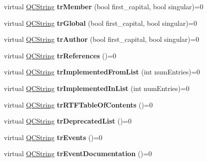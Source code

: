 \begin{DoxyCompactItemize}
virtual \mbox{\hyperlink{class_q_c_string}{Q\+C\+String}} {\bfseries tr\+Member} (bool first\+\_\+capital, bool singular)=0
\item 
\mbox{\label{class_translator_a5a2679653633e7b81db3158b90216704}} 
virtual \mbox{\hyperlink{class_q_c_string}{Q\+C\+String}} {\bfseries tr\+Global} (bool first\+\_\+capital, bool singular)=0
\item 
\mbox{\label{class_translator_ab1d687861b87ec383f96cc0b323be6eb}} 
virtual \mbox{\hyperlink{class_q_c_string}{Q\+C\+String}} {\bfseries tr\+Author} (bool first\+\_\+capital, bool singular)=0
\item 
\mbox{\label{class_translator_a9c8edf9885d809f859f7c91d847d2f67}} 
virtual \mbox{\hyperlink{class_q_c_string}{Q\+C\+String}} {\bfseries tr\+References} ()=0
\item 
\mbox{\label{class_translator_af6f635d2008014eab980bc9aa8544606}} 
virtual \mbox{\hyperlink{class_q_c_string}{Q\+C\+String}} {\bfseries tr\+Implemented\+From\+List} (int num\+Entries)=0
\item 
\mbox{\label{class_translator_a7d211e806e62d4203fa532b4735be716}} 
virtual \mbox{\hyperlink{class_q_c_string}{Q\+C\+String}} {\bfseries tr\+Implemented\+In\+List} (int num\+Entries)=0
\item 
\mbox{\label{class_translator_a68212eef7295b4a261cd05b88f00aa8b}} 
virtual \mbox{\hyperlink{class_q_c_string}{Q\+C\+String}} {\bfseries tr\+R\+T\+F\+Table\+Of\+Contents} ()=0
\item 
\mbox{\label{class_translator_a3da3ae447f82df17863e3ab80be0a8e9}} 
virtual \mbox{\hyperlink{class_q_c_string}{Q\+C\+String}} {\bfseries tr\+Deprecated\+List} ()=0
\item 
\mbox{\label{class_translator_ac9e66274bee002ddd496457b2f3dc266}} 
virtual \mbox{\hyperlink{class_q_c_string}{Q\+C\+String}} {\bfseries tr\+Events} ()=0
\item 
\mbox{\label{class_translator_a2c96efb89bc411ddbfe8250f9d0e2e24}} 
virtual \mbox{\hyperlink{class_q_c_string}{Q\+C\+String}} {\bfseries tr\+Event\+Documentation} ()=0

\end{DoxyCompactItemize}
